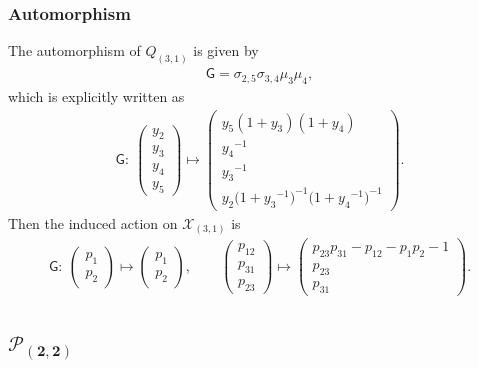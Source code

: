 \documentclass[10pt,a4paper]{amsart}
\numberwithin{equation}{section}
\begin{document}
\subsubsection*{Automorphism}
The automorphism of $Q_{(3,1)}$ is given by
\begin{gather} \label{G_31}
 \mathsf{G} = \sigma_{2,5} \sigma_{3,4} \mu_3 \mu_4 ,
\end{gather}
which is explicitly written as
\begin{gather*}
 \mathsf{G}\colon \
 \begin{pmatrix}
 y_2 \\ y_3 \\ y_4 \\ y_5
 \end{pmatrix}
 \mapsto
 \begin{pmatrix}
 y_5 ( 1+ y_3 ) ( 1+ y_4 ) \\
 {y_4}^{-1} \\
 {y_3}^{-1} \\
 y_2 \big( 1+ {y_3}^{-1} \big)^{-1} \big( 1+ {y_4}^{-1} \big)^{-1}
 \end{pmatrix} .
\end{gather*}
Then the induced action on $\mathcal{X}_{(3,1)}$ is
\begin{gather*}
 \mathsf{G}\colon \
 \begin{pmatrix}
 p_1 \\
 p_2
 \end{pmatrix}
 \mapsto
 \begin{pmatrix}
 p_1 \\
 p_2
 \end{pmatrix} , \qquad
 \begin{pmatrix}
 p_{12} \\ p_{31} \\ p_{23}
 \end{pmatrix}
 \mapsto
 \begin{pmatrix}
 p_{23} p_{31} - p_{12} - p_1 p_2 - 1 \\
 p_{23} \\
 p_{31}
 \end{pmatrix} .
\end{gather*}

\subsection[$\mathcal{P}_{(2,2)}$]{$\boldsymbol{\mathcal{P}_{(2,2)}}$}
\end{document}
